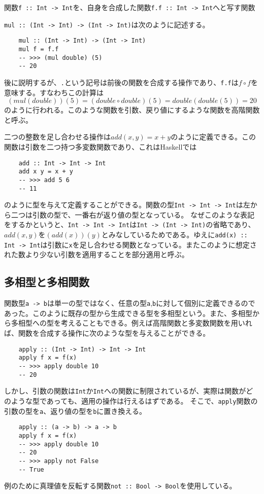 \documentclass[uplatex,dvipdfmx]{jsarticle}
\newcommand{\pr}[1]{\colorbox[rgb]{0.9,0.9,0.9}{\lstinline{#1}}}
\newcommand{\functype}[2]{\pr{#1 -> #2}}
\newcommand{\fpmor}[3]{\pr{#1 :: #2 -> #3}}
\begin{document}
  関数\fpmor{f}{Int}{Int}を、自身を合成した関数\fpmor{f.f}{Int}{Int}へと写す関数
  
  \fpmor{mul}{(Int -> Int)}{(Int -> Int)}は次のように記述する。
  \begin{lstlisting}
    mul :: (Int -> Int) -> (Int -> Int)
    mul f = f.f
    -- >>> (mul double) (5)
    -- 20
  \end{lstlisting}
  後に説明するが、\pr{.}という記号は前後の関数を合成する操作であり、\pr{f.f}は$f\circ f$を意味する。すなわちこの計算は
  \[(mul(double))(5)=(double \circ double)(5)=double(double(5))=20\]のように行われる。このような関数を引数、戻り値にするような関数を高階関数と呼ぶ。
  
  二つの整数を足し合わせる操作は$add(x,y)=x+y$のように定義できる。この関数は引数を二つ持つ多変数関数であり、これはHaskellでは
  \begin{lstlisting}
    add :: Int -> Int -> Int
    add x y = x + y
    -- >>> add 5 6
    -- 11
  \end{lstlisting}
  のように型を与えて定義することができる。関数の型\pr{Int -> Int -> Int}は左から二つは引数の型で、一番右が返り値の型となっている。
  なぜこのような表記をするかというと、\pr{Int -> Int -> Int}は\pr{Int -> (Int -> Int)}の省略であり、$add(x,y)$を$(add(x))(y)$とみなしているためである。ゆえに\fpmor{add(x)}{Int}{Int}は引数に\pr{x}を足し合わせる関数となっている。またこのように想定された数より少ない引数を適用することを部分適用と呼ぶ。
  \subsection{多相型と多相関数}
  関数型\functype{a}{b}は単一の型ではなく、任意の型\pr{a},\pr{b}に対して個別に定義できるのであった。このように既存の型から生成できる型を多相型という。また、多相型から多相型への型を考えることもできる。例えば高階関数と多変数関数を用いれば、関数を合成する操作に次のような型を与えることができる。
  \begin{lstlisting}
    apply :: (Int -> Int) -> Int -> Int
    apply f x = f(x)
    -- >>> apply double 10
    -- 20
  \end{lstlisting}
  しかし、引数の関数は\pr{Int}か\pr{Int}への関数に制限されているが、実際は関数がどのような型であっても、適用の操作は行えるはずである。
  そこで、\pr{apply}関数の引数の型を\pr{a}、返り値の型を\pr{b}に置き換える。
    \begin{lstlisting}
    apply :: (a -> b) -> a -> b
    apply f x = f(x)
    -- >>> apply double 10
    -- 20
    -- >>> apply not False
    -- True
  \end{lstlisting}
  例のために真理値を反転する関数\fpmor{not}{Bool}{Bool}を使用している。
\end{document}
